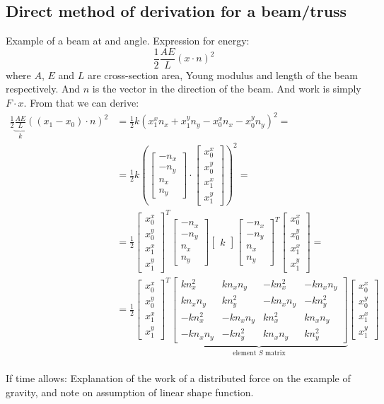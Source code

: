 \documentclass{article}
\newcommand{\mat}[1]{\left[\begin{matrix}#1\end{matrix}\right]}
\begin{document}
\subsection{Direct method of derivation for a beam/truss}

Example of a beam at and angle. Expression for energy:
\[\frac{1}{2}\frac{AE}{L}(x\cdot n)^2\]
where $A$, $E$ and $L$ are cross-section area, Young modulus and length of the beam respectively. And $n$ is the vector in the direction of the beam. And work is simply $F\cdot x$. From that we can derive:
\begin{align*}\frac{1}{2}\underbrace{\frac{AE}{L}}_k((x_1-x_0)\cdot n)^2 &= \frac{1}{2}k(x^x_1n_x+x^y_1n_y-x^x_0n_x-x^y_0n_y)^2 =\\
&= \frac{1}{2}k\left(\mat{-n_x\\-n_y\\n_x\\n_y}\cdot\mat{x^x_0\\x^y_0\\x^x_1\\x^y_1}\right)^2 =\\
&= \frac{1}{2}\mat{x^x_0\\x^y_0\\x^x_1\\x^y_1}^T\mat{-n_x\\-n_y\\n_x\\n_y}\mat{k}\mat{-n_x\\-n_y\\n_x\\n_y}^T\mat{x^x_0\\x^y_0\\x^x_1\\x^y_1} =\\
&= \frac{1}{2}\mat{x^x_0\\x^y_0\\x^x_1\\x^y_1}^T\underbrace{\mat{kn_x^2 & kn_xn_y & -kn_x^2 & -kn_xn_y\\kn_xn_y & kn_y^2 & -kn_xn_y & -kn_y^2\\-kn_x^2 & -kn_xn_y & kn_x^2 & kn_xn_y\\-kn_xn_y & -kn_y^2 & kn_xn_y & kn_y^2}}_\text{element $S$ matrix}\mat{x^x_0\\x^y_0\\x^x_1\\x^y_1}\\
\end{align*}

If time allows:
Explanation of the work of a distributed force on the example of gravity, and note on assumption of linear shape function.
\end{document}
